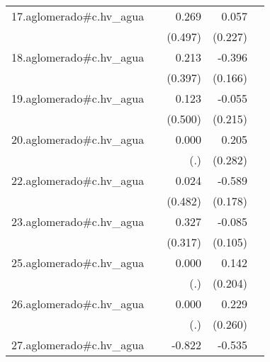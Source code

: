 {\begin{longtable}{l*{4}{D{.}{.}{-1}}}
\addlinespace
17.aglomerado#c.hv\_agua&                     &       0.269         &       0.057         &                     \\
            &                     &     (0.497)         &     (0.227)         &                     \\
\addlinespace
18.aglomerado#c.hv\_agua&                     &       0.213         &      -0.396\sym{*}  &                     \\
            &                     &     (0.397)         &     (0.166)         &                     \\
\addlinespace
19.aglomerado#c.hv\_agua&                     &       0.123         &      -0.055         &                     \\
            &                     &     (0.500)         &     (0.215)         &                     \\
\addlinespace
20.aglomerado#c.hv\_agua&                     &       0.000         &       0.205         &                     \\
            &                     &         (.)         &     (0.282)         &                     \\
\addlinespace
22.aglomerado#c.hv\_agua&                     &       0.024         &      -0.589\sym{***}&                     \\
            &                     &     (0.482)         &     (0.178)         &                     \\
\addlinespace
23.aglomerado#c.hv\_agua&                     &       0.327         &      -0.085         &                     \\
            &                     &     (0.317)         &     (0.105)         &                     \\
\addlinespace
25.aglomerado#c.hv\_agua&                     &       0.000         &       0.142         &                     \\
            &                     &         (.)         &     (0.204)         &                     \\
\addlinespace
26.aglomerado#c.hv\_agua&                     &       0.000         &       0.229         &                     \\
            &                     &         (.)         &     (0.260)         &                     \\
\addlinespace
27.aglomerado#c.hv\_agua&                     &      -0.822         &      -0.535\sym{**} &                     \\

\end{longtable}}
